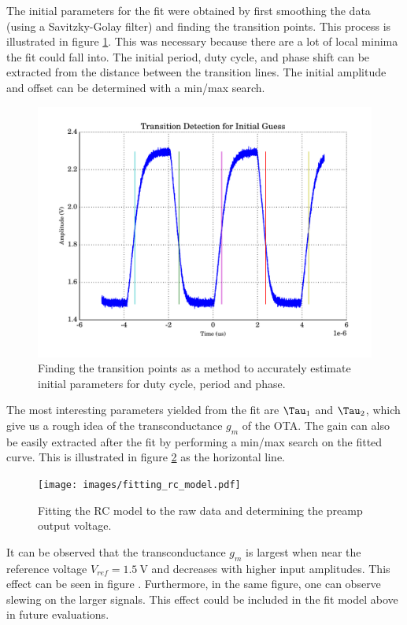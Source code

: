 The initial parameters for the  fit  were obtained by first smoothing the data
(using  a  Savitzky-Golay  filter) and finding  the  transition  points.  This
process is illustrated  in  figure  \ref{fig:transition_detection}.  This  was
necessary because there are a lot of local minima the fit could fall into. The
initial period, duty cycle, and phase shift can be extracted from the distance
between the  transition  lines.  The  initial  amplitude  and  offset  can  be
determined with a min/max search.

\begin{figure}
    \centering
    \includegraphics[width=.7\linewidth]{images/plots/transition-detection.pdf}
    \caption{Finding the transition points as a method to accurately estimate initial parameters for duty cycle, period and phase.}
    \label{fig:transition_detection}
\end{figure}

The  most  interesting  parameters  yielded  from  the fit  are  $\Tau_1$  and
$\Tau_2$, which give us a rough idea of the transconductance $g_m$ of the OTA.
The gain can also be easily extracted after  the  fit  by performing a min/max
search   on   the   fitted   curve.   This    is    illustrated    in   figure
\ref{fig:fitting_rc_model} as the horizontal line.

\begin{figure}
    \centering
    \texttt{[image: images/fitting\_rc\_model.pdf]}
    \caption{Fitting the RC model to the raw data and determining the preamp output voltage.}
    \label{fig:fitting_rc_model}
\end{figure}

It can be observed that the transconductance $g_m$ is largest  when  near  the
reference voltage $V_{ref}=\SI{1.5}{\volt}$ and  decreases  with  higher input
amplitudes. This effect can be seen in  figure . Furthermore, in the same figure, one can
observe slewing on  the  larger  signals. This effect could be included in the
fit model above in future evaluations.

